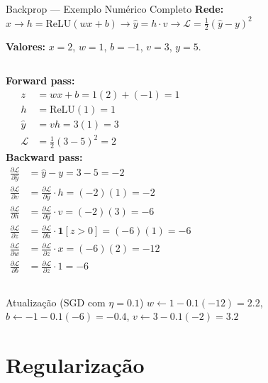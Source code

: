 \documentclass[7pt, aspectratio=169,10pt]{beamer}
\newcommand{\pdiff}[2]{\frac{\partial #1}{\partial #2}}
\begin{document}
\begin{frame}{Backprop — Exemplo Numérico Completo}
\small
\textbf{Rede:} $x\to h=\text{ReLU}(wx+b)\to\hat{y}=h \cdot v \to \mathcal{L}=\tfrac{1}{2}(\hat{y}-y)^2$

\textbf{Valores:} $x=2$, $w=1$, $b=-1$, $v=3$, $y=5$.
\begin{columns}[T]
\textbf{Forward pass:}
\begin{align*}
  z &= wx+b = 1(2)+(-1) = 1\\
  h &= \text{ReLU}(1) = 1\\
  \hat{y} &= vh = 3(1) = 3\\
  \mathcal{L} &= \tfrac{1}{2}(3-5)^2 = 2
\end{align*}
\textbf{Backward pass:}
\begin{align*}
  \pdiff{\mathcal{L}}{\hat{y}} &= \hat{y}-y = 3-5 = -2\\
  \pdiff{\mathcal{L}}{v} &= \pdiff{\mathcal{L}}{\hat{y}}\cdot h = (-2)(1)=-2\\
  \pdiff{\mathcal{L}}{h} &= \pdiff{\mathcal{L}}{\hat{y}}\cdot v = (-2)(3)=-6\\
  \pdiff{\mathcal{L}}{z} &= \pdiff{\mathcal{L}}{h}\cdot\mathbf{1}[z>0]=(-6)(1)=-6\\
  \pdiff{\mathcal{L}}{w} &= \pdiff{\mathcal{L}}{z}\cdot x = (-6)(2) = -12\\
  \pdiff{\mathcal{L}}{b} &= \pdiff{\mathcal{L}}{z}\cdot 1 = -6
\end{align*}
\end{columns}
\begin{exampleblock}{Atualização (SGD com $\eta=0.1$)}
$w \leftarrow 1 - 0.1(-12) = 2.2$,\quad
$b \leftarrow -1 - 0.1(-6) = -0.4$,\quad
$v \leftarrow 3 - 0.1(-2) = 3.2$
\end{exampleblock}
\end{frame}

\section{Regularização}
\end{document}
